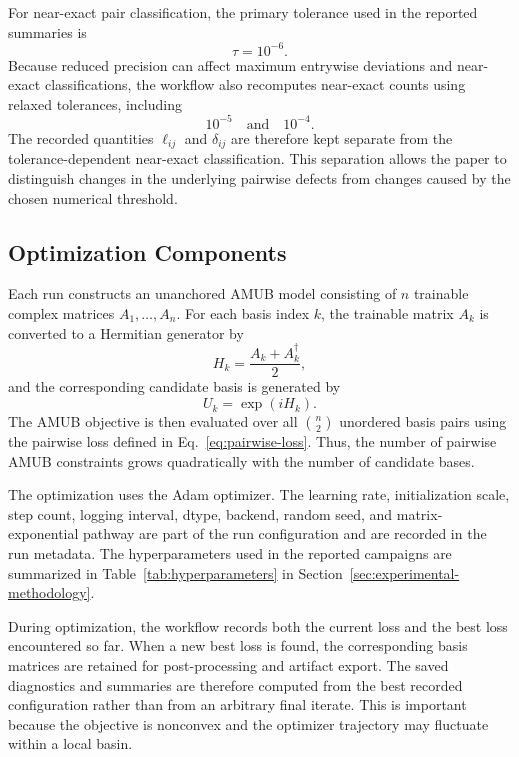 \documentclass[a4paper,twocolumn,11pt,amsfonts,amssymb]{quantumarticle}
\begin{document}
For near-exact pair classification, the primary tolerance used in the reported summaries is
\[
    \tau = 10^{-6}.
\]
Because reduced precision can affect maximum entrywise deviations and near-exact classifications, the workflow also recomputes near-exact counts using relaxed tolerances, including
\[
    10^{-5}
    \quad\text{and}\quad
    10^{-4}.
\]
The recorded quantities \(\ell_{ij}\) and \(\delta_{ij}\) are therefore kept separate from the tolerance-dependent near-exact classification. This separation allows the paper to distinguish changes in the underlying pairwise defects from changes caused by the chosen numerical threshold.

\subsection{Optimization Components}

Each run constructs an unanchored AMUB model consisting of $n$ trainable complex matrices $A_1,\ldots,A_n$. For each basis index $k$, the trainable matrix $A_k$ is converted to a Hermitian generator by
\begin{equation*}
    H_k = \frac{A_k + A_k^\dagger}{2},
\end{equation*}
and the corresponding candidate basis is generated by
\begin{equation*}
    U_k = \exp(iH_k).
\end{equation*}
The AMUB objective is then evaluated over all $\binom{n}{2}$ unordered basis pairs using the pairwise loss defined in Eq.~\eqref{eq:pairwise-loss}. Thus, the number of pairwise AMUB constraints grows quadratically with the number of candidate bases.

The optimization uses the Adam optimizer. The learning rate, initialization scale, step count, logging interval, dtype, backend, random seed, and matrix-exponential pathway are part of the run configuration and are recorded in the run metadata. The hyperparameters used in the reported campaigns are summarized in Table~\ref{tab:hyperparameters} in Section~\ref{sec:experimental-methodology}.

During optimization, the workflow records both the current loss and the best loss encountered so far. When a new best loss is found, the corresponding basis matrices are retained for post-processing and artifact export. The saved diagnostics and summaries are therefore computed from the best recorded configuration rather than from an arbitrary final iterate. This is important because the objective is nonconvex and the optimizer trajectory may fluctuate within a local basin.
\end{document}
